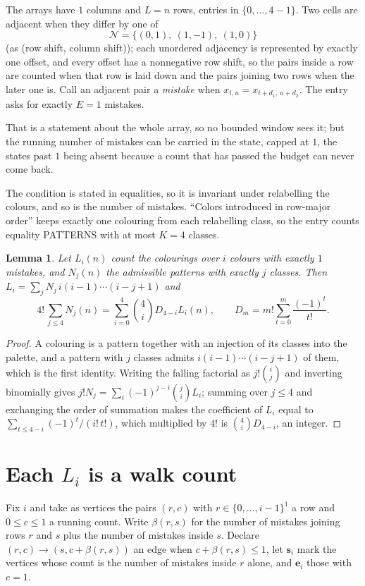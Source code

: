 \documentclass[11pt,a4paper]{article}
\theoremstyle{plain}
\newtheorem{lemma}[theorem]{Lemma}
\theoremstyle{definition}
\begin{document}
The arrays have $1$ columns and $L=n$ rows, entries in $\{0,\dots,4-1\}$.
Two cells are adjacent when they differ by one of
\[
\mathcal N=\{(0,1),\ (1,-1),\ (1,0)\}
\]
(as (row shift, column shift)); each unordered adjacency is represented by exactly one
offset, and every offset has a nonnegative row shift, so the pairs inside a row are
counted when that row is laid down and the pairs joining two rows when the later one
is. Call an adjacent pair a \emph{mistake} when $x_{t,u}=x_{t+d_1,\,u+d_2}$. The entry asks for exactly
$E=1$ mistakes.

That is a statement about the whole array, so no bounded window sees it; but the running
number of mistakes can be carried in the state, capped at $1$, the states past $1$ being
absent because a count that has passed the budget can never come back.

The condition is stated in equalities, so it is invariant under relabelling the colours, and
so is the number of mistakes. ``Colors introduced in row-major order'' keeps exactly one
colouring from each relabelling class, so the entry counts equality PATTERNS with at most
$K=4$ classes.

\begin{lemma}\label{lem:inv}
Let $L_i(n)$ count the colourings over $i$ colours with exactly $1$ mistakes, and $N_j(n)$
the admissible patterns with exactly $j$ classes. Then
$L_i=\sum_j N_j\,i(i-1)\cdots(i-j+1)$ and
\[
4!\,\sum_{j\le4}N_j(n)=\sum_{i=0}^{4}\binom{4}{i}D_{4-i}L_i(n),
\qquad D_m=m!\sum_{t=0}^{m}\frac{(-1)^t}{t!} .
\]
\end{lemma}

\begin{proof}
A colouring is a pattern together with an injection of its classes into the palette, and a
pattern with $j$ classes admits $i(i-1)\cdots(i-j+1)$ of them, which is the first identity.
Writing the falling factorial as $j!\binom{i}{j}$ and inverting binomially gives
$j!N_j=\sum_i(-1)^{j-i}\binom{j}{i}L_i$; summing over $j\le4$ and exchanging the order
of summation makes the coefficient of $L_i$ equal to $\sum_{t\le4-i}(-1)^t/(i!\,t!)$,
which multiplied by $4!$ is $\binom{4}{i}D_{4-i}$, an integer.
\end{proof}

\section{Each $L_i$ is a walk count}

Fix $i$ and take as vertices the pairs $(r,c)$ with $r\in\{0,\dots,i-1\}^{1}$ a row
and $0\le c\le1$ a running count. Write $\beta(r,s)$ for the number of mistakes joining
rows $r$ and $s$ plus the number of mistakes inside $s$. Declare $(r,c)\to(s,c+\beta(r,s))$
an edge when $c+\beta(r,s)\le1$, let $\mathbf{s}_i$ mark the vertices whose count is the
number of mistakes inside $r$ alone, and $\mathbf{e}_i$ those with $c=1$.
\end{document}
